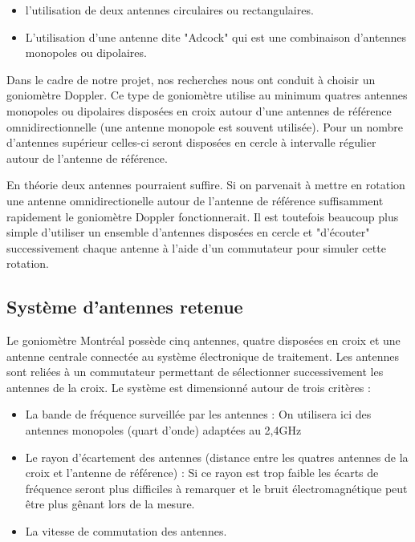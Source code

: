 \begin{itemize}

\item l'utilisation de deux antennes circulaires ou rectangulaires.

\item L'utilisation d'une antenne dite "Adcock" qui est une combinaison d'antennes monopoles ou dipolaires. 

\end{itemize} 

	Dans le cadre de notre projet, nos recherches nous ont conduit à choisir un goniomètre Doppler. Ce type de goniomètre utilise au minimum quatres antennes monopoles ou dipolaires disposées en croix autour d'une antennes de référence omnidirectionnelle (une antenne monopole est souvent utilisée). Pour un nombre d'antennes supérieur celles-ci seront disposées en cercle à intervalle régulier autour de l'antenne de référence.	
	
	En théorie deux antennes pourraient suffire. Si on parvenait à mettre en rotation une antenne omnidirectionelle autour de l'antenne de référence suffisamment rapidement le goniomètre Doppler fonctionnerait. Il est toutefois beaucoup plus simple d'utiliser un ensemble d'antennes disposées en cercle et "d'écouter" successivement chaque antenne à l'aide d'un commutateur pour simuler cette rotation.
	
\subsection{Système d'antennes retenue}

	Le goniomètre Montréal possède cinq antennes, quatre disposées en croix et une antenne centrale connectée au système électronique de traitement. Les antennes sont reliées à un commutateur permettant de sélectionner successivement les antennes de la croix. Le système est dimensionné autour de trois critères : 
	
\begin{itemize}

\item La bande de fréquence surveillée par les antennes : On utilisera ici des antennes monopoles (quart d'onde) adaptées au 2,4GHz

\item Le rayon d'écartement des antennes (distance entre les quatres antennes de la croix et l'antenne de référence) : Si ce rayon est trop faible les écarts de fréquence seront plus difficiles à remarquer et le bruit électromagnétique peut être plus gênant lors de la mesure.


\item La vitesse de commutation des antennes.

\end{itemize}

